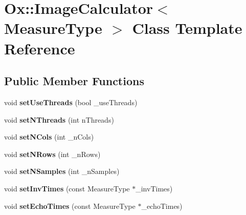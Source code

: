 \hypertarget{class_ox_1_1_image_calculator}{}\section{Ox\+:\+:Image\+Calculator$<$ Measure\+Type $>$ Class Template Reference}
\label{class_ox_1_1_image_calculator}
\subsection*{Public Member Functions}
\begin{DoxyCompactItemize}
\item 
void {\bfseries set\+Use\+Threads} (bool \+\_\+use\+Threads)\hypertarget{class_ox_1_1_image_calculator_a7be88cf7363fd80c9e15f45a7c1ec2f9}{}\label{class_ox_1_1_image_calculator_a7be88cf7363fd80c9e15f45a7c1ec2f9}

\item 
void {\bfseries set\+N\+Threads} (int n\+Threads)\hypertarget{class_ox_1_1_image_calculator_ab409d3f959d5b390a8b4ef598890e716}{}\label{class_ox_1_1_image_calculator_ab409d3f959d5b390a8b4ef598890e716}

\item 
void {\bfseries set\+N\+Cols} (int \+\_\+n\+Cols)\hypertarget{class_ox_1_1_image_calculator_a7a8e99362b52f4e5b81883ba73095347}{}\label{class_ox_1_1_image_calculator_a7a8e99362b52f4e5b81883ba73095347}

\item 
void {\bfseries set\+N\+Rows} (int \+\_\+n\+Rows)\hypertarget{class_ox_1_1_image_calculator_ab3990b041e3bba8dc8d291e6d5e0620c}{}\label{class_ox_1_1_image_calculator_ab3990b041e3bba8dc8d291e6d5e0620c}

\item 
void {\bfseries set\+N\+Samples} (int \+\_\+n\+Samples)\hypertarget{class_ox_1_1_image_calculator_afb20deb27b05d3adc6d632f507c1a96f}{}\label{class_ox_1_1_image_calculator_afb20deb27b05d3adc6d632f507c1a96f}

\item 
void {\bfseries set\+Inv\+Times} (const Measure\+Type $\ast$\+\_\+inv\+Times)\hypertarget{class_ox_1_1_image_calculator_a7648a9014a039945b3e19a83221dfe0c}{}\label{class_ox_1_1_image_calculator_a7648a9014a039945b3e19a83221dfe0c}

\item 
void {\bfseries set\+Echo\+Times} (const Measure\+Type $\ast$\+\_\+echo\+Times)\hypertarget{class_ox_1_1_image_calculator_afaf23149cc2b22f1fd7a2273c86e8fda}{}\label{class_ox_1_1_image_calculator_afaf23149cc2b22f1fd7a2273c86e8fda}


\end{DoxyCompactItemize}
